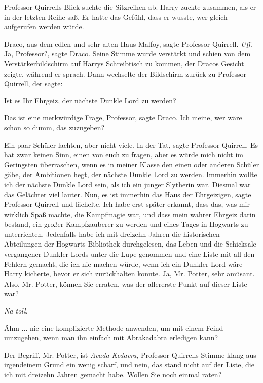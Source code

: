 Professor Quirrells Blick suchte die Sitzreihen ab. Harry zuckte zusammen, als
er in der letzten Reihe saß. Er hatte das Gefühl, dass er wusste, wer gleich
aufgerufen werden würde.

\glqq{}Draco, aus dem edlen und sehr alten Haus Malfoy\grqq{}, sagte Professor
Quirrell. \emph{Uff}. \glqq{}Ja, Professor?\grqq{}, sagte Draco. Seine Stimme
wurde verstärkt und schien von dem Verstärkerbildschirm auf Harrys Schreibtisch
zu kommen, der Dracos Gesicht zeigte, während er sprach. Dann wechselte der
Bildschirm zurück zu Professor Quirrell, der sagte:

\glqq{}Ist es Ihr Ehrgeiz, der nächste Dunkle Lord zu werden?\grqq{}

\glqq{}Das ist eine merkwürdige Frage, Professor\grqq{}, sagte Draco. \glqq{}Ich
meine, wer wäre schon so dumm, das zuzugeben?\grqq{}

Ein paar Schüler lachten, aber nicht viele. \glqq{}In der Tat\grqq{}, sagte
Professor Quirrell. \glqq{}Es hat zwar keinen Sinn, einen von euch zu fragen,
aber es würde mich nicht im Geringsten überraschen, wenn es in meiner Klasse den
einen oder anderen Schüler gäbe, der Ambitionen hegt, der nächste Dunkle Lord zu
werden. Immerhin wollte ich der nächste Dunkle Lord sein, als ich ein junger
Slytherin war.\grqq{} Diesmal war das Gelächter viel lauter. \glqq{}Nun, es ist
immerhin das Haus der Ehrgeizigen\grqq{}, sagte Professor Quirrell und lächelte.
\glqq{}Ich habe erst später erkannt, dass das, was mir wirklich Spaß machte, die
Kampfmagie war, und dass mein wahrer Ehrgeiz darin bestand, ein großer
Kampfzauberer zu werden und eines Tages in Hogwarts zu unterrichten. Jedenfalls
habe ich mit dreizehn Jahren die historischen Abteilungen der
Hogwarts-Bibliothek durchgelesen, das Leben und die Schicksale vergangener
Dunkler Lords unter die Lupe genommen und eine Liste mit all den Fehlern
gemacht, die ich nie machen würde, wenn ich ein Dunkler Lord wäre -\grqq{} Harry
kicherte, bevor er sich zurückhalten konnte. \glqq{}Ja, Mr. Potter, sehr amüsant.
Also, Mr. Potter, können Sie erraten, was der allererste Punkt auf dieser Liste
war?\grqq{}

\emph{Na toll.}

\glqq{}Ähm ... nie eine komplizierte Methode anwenden, um mit einem Feind
umzugehen, wenn man ihn einfach mit Abrakadabra erledigen kann?\grqq{}

\glqq{}Der Begriff, Mr. Potter, ist \emph{Avada Kedavra}\grqq{}, Professor
Quirrells Stimme klang aus irgendeinem Grund ein wenig scharf, \glqq{}und nein,
das stand nicht auf der Liste, die ich mit dreizehn Jahren gemacht habe. Wollen
Sie noch einmal raten?\grqq{}

